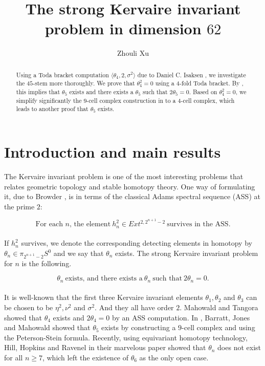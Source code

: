 \documentclass[psamsfonts]{amsart}
\title{The strong Kervaire invariant problem in dimension $62$}
\author{Zhouli Xu}
\theoremstyle{definition}
\numberwithin{equation}{section}
\begin{document}
\maketitle

\begin{abstract}

Using a Toda bracket computation $\langle \theta_4, 2, \sigma^2\rangle$ due to Daniel C. Isaksen \cite{DI2}, we investigate the $45$-stem more thoroughly. We prove that $\theta_4^2=0$ using a $4$-fold Toda bracket. By \cite{BJM2}, this implies that $\theta_5$ exists and there exists a $\theta_5$ such that $2\theta_5=0$. Based on $\theta_4^2=0$, we simplify significantly the $9$-cell complex construction in \cite{BJM1} to a $4$-cell complex, which leads to another proof that $\theta_5$ exists.

\end{abstract}

\section{Introduction and main results}

The Kervaire invariant problem is one of the most interesting problems that relates geometric topology and stable homotopy theory. One way of formulating it, due to Browder \cite{Brd},  is in terms of the classical Adams spectral sequence (ASS) at the prime $2$:

$$\text{For each $n$, the element}~ h_n^2\in Ext^{2, 2^{n+1}-2} ~\text{survives in the ASS.}$$
\\
If $h_n^2$ survives, we denote the corresponding detecting elements in homotopy by $\theta_n\in\pi_{2^{n+1}-2}S^0$ and we say that $\theta_n$ exists. The strong Kervaire invariant problem for $n$ is the following.

$$\theta_n ~\text{exists, and there exists a}~ \theta_n ~\text{such that}~ 2 \theta_n =0.$$
\\
It is well-known that the first three Kervaire invariant elements $\theta_1, \theta_2$ and $\theta_3$ can be chosen to be $\eta^2, \nu^2$ and $\sigma^2$. And they all have order $2$. Mahowald and Tangora \cite{MT} showed that $\theta_4$ exists and $2 \theta_4=0$ by an ASS computation. In \cite{BJM1}, Barratt, Jones and Mahowald showed that $\theta_5$ exists by constructing a $9$-cell complex and using the Peterson-Stein formula. Recently, using equivariant homotopy technology, Hill, Hopkins and Ravenel \cite{HHR} in their marvelous paper showed that $\theta_n$ does not exist for all $n\geq 7$, which left the existence of $\theta_6$ as the only open case.\\
\end{document}
